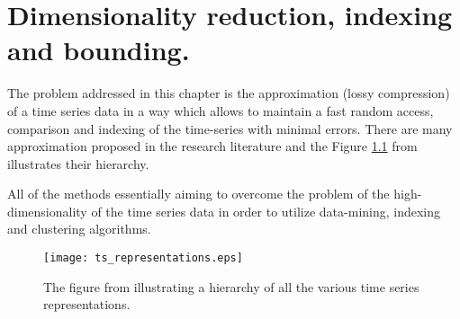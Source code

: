 \chapter{Dimensionality reduction, indexing and bounding.}
The problem addressed in this chapter is the approximation (lossy compression) of a time series data in a way which allows to maintain a fast random access, comparison and indexing of the time-series with minimal errors. There are many approximation proposed in the research literature and the Figure \ref{fig:approximations} from \cite{citeulike:2821475} illustrates their hierarchy.

All of the methods essentially aiming to overcome the problem of the high-dimensionality of the time series data in order to utilize data-mining, indexing and clustering algorithms. 


\begin{figure}[tbp]
   \centering
   \texttt{[image: ts\_representations.eps]}
   \caption{The figure from \cite{citeulike:2821475} illustrating a hierarchy of all the various time series representations.}
   \label{fig:approximations}
\end{figure} 
